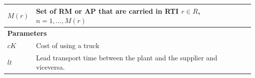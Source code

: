 \begin{longtable}[hbt!]{  |p{}|p{}  |}
  $M(r)$                                                                                         & Set of RM or AP that are carried in RTI $r \in R$, $n = 1, \dots, M(r)$                                                                                                                                                                                                                                                                                                                                                                                                                                                                                                        \\
  \hline
  \multicolumn{2}{|l|}{\textbf{Parameters}}                                                                                                                                                                                                                                                                                                                                                                                                                                                                                                                                                                                                                                       \\ \hline
  $cK$                                                                                           & Cost of using a truck                                                                                                                                                                                                                                                                                                                                                                                                                                                                                                                                                          \\
  $lt$                                                                                           & Lead transport time between the plant and the supplier and viceversa.                                                                                                                                                                                                                                                                                                                                                                                                                                                                                                          \\

\end{longtable}
